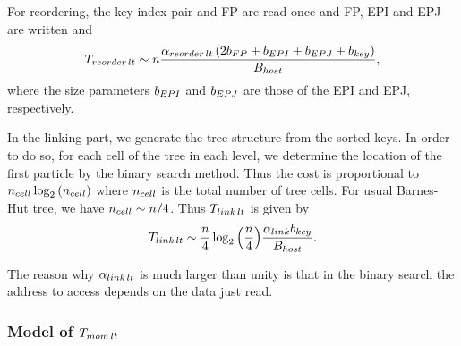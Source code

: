 \documentclass[dvipdfmx]{pasj01}
\begin{document}
For reordering, the key-index pair and FP are read once and FP, EPI
and EPJ are written and 
\begin{equation}
T_{\rm reorder\, lt} \sim n \frac{\alpha_{\rm reorder\, lt} \left(2b_{\rm FP}+b_{\rm EPI}+b_{\rm EPJ}+b_{\rm key} \right)}{B_{\rm host}},
\end{equation}
where the size parameters $b_{\rm EPI}$ and $b_{\rm EPJ}$ are those of
the EPI and EPJ, respectively.

In the linking part, we generate the tree structure from the sorted
keys.  In order to do so, for each cell of the tree in each level, we
determine the location of the first particle by the binary search
method. Thus the cost is proportional to $n_{\rm cell} \log_2\left(
n_{\rm cell}\right)$ where $n_{\rm cell}$ is the total number of tree
cells. For usual Barnes-Hut tree, we have $n_{\rm cell} \sim n/4$.
Thus $T_{\rm link\, lt}$ is given by
\begin{equation}
  T_{\rm link\, lt} \sim \frac{n}{4} \log_2{ \left( \frac{n}{4} \right) } \frac{\alpha_{\rm link} b_{\rm key} }{B_{\rm host}}.
  \label{eq:lt_link}
\end{equation}



The reason why $\alpha_{\rm link\, lt}$ is much larger than unity is
that in the binary search the address to access depends on the data
just read.


\subsubsection{Model of $T_{\rm mom\, lt}$}
\end{document}
